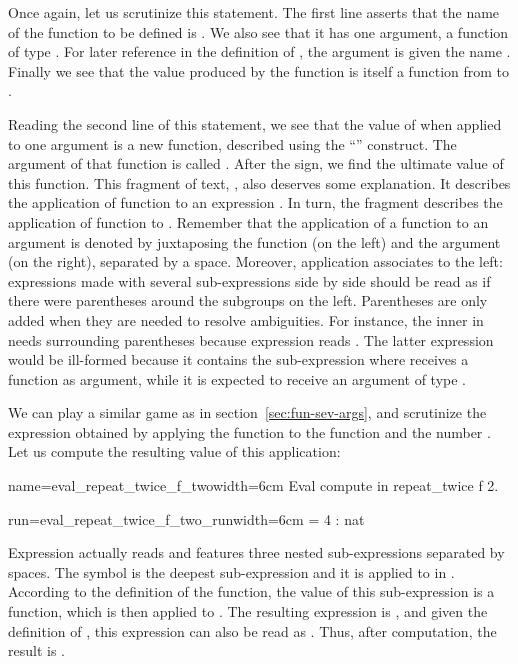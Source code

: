 Once again, let us scrutinize this \Coq{} statement. The first line
asserts that the name of the function to be defined is .
We also see that it has one argument, a function of
type .  For later reference in the definition of
, the argument is given the name .  Finally
we see that the value produced by the function 
is itself a function from  to .

Reading the second line of this statement, we see that the value
of  when applied to one argument is a new
function, described using the ``'' construct.  The
argument of that function is called .  After the \C{=>} sign, we
find the ultimate value of this function.  This fragment of text, , also deserves some explanation. It describes the
application of function  to an expression .  In turn,
the fragment  describes the application of function  to
. Remember that the  application of a function to an
argument is denoted by juxtaposing the function (on the left) and
the argument (on the right), separated by a space. Moreover,
application associates to the left: expressions made with
several sub-expressions side by side should be read as if there were
parentheses around the subgroups on the left. Parentheses are
only added when they are needed to resolve ambiguities.
For instance, the inner  in
 needs surrounding parentheses because expression
 reads .  The latter expression would be
ill-formed because it contains the sub-expression  where
 receives a function as argument, while it is expected to receive
an argument of type .

We can play a similar game as in section~\ref{sec:fun-sev-args},
and scrutinize the expression obtained by applying the
function  to  the function
 and the number . Let us compute the resulting value of this
application:

\begin{coq}{name=eval_repeat_twice_f_two}{width=6cm}
Eval compute in repeat_twice f 2.
\end{coq}
\begin{coqout}{run=eval_repeat_twice_f_two_run}{width=6cm}
= 4 : nat
\end{coqout}

Expression  actually reads
 and features three nested sub-expressions separated by
spaces. The symbol  is the deepest
sub-expression and it is applied to  in .
According to the definition of the  function, the value of
this sub-expression is a function, which is then applied to .
The resulting expression is , and given the
definition of , this expression can also
be read as .  Thus, after computation, the result is .

